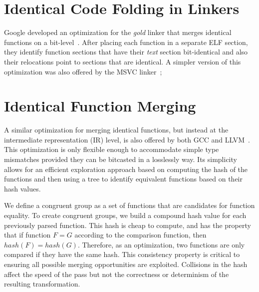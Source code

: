 
\section{Identical Code Folding in Linkers}

Google developed an optimization for the \textit{gold} linker that merges
identical functions on a bit-level~\cite{tallam10,kwan12}.
After placing each function in a separate ELF section, they identify function
sections that have their \textit{text} section bit-identical and also their
relocations point to sections that are identical. A simpler version of this
optimization was also offered by the MSVC linker~\cite{msvc-icf};

\section{Identical Function Merging}

A similar optimization for merging identical functions, but instead at the
intermediate representation (IR) level, is also offered by both GCC and
LLVM~\cite{llvm-fm,livska14}.
This optimization is only flexible enough to accommodate simple type mismatches
provided they can be bitcasted in a losslessly way.
Its simplicity allows for an efficient exploration approach based on computing
the hash of the functions and then using a tree to identify equivalent functions
based on their hash values.



We define a congruent group as a set of functions that are candidates for function
equality.
To create congruent groups, we build a compound hash value for each previously parsed function.
This hash is
cheap to compute, and has the property that if function $F = G$ according to
the comparison function, then $hash(F) = hash(G)$.
Therefore, as an optimization, two functions are only compared if they have the
same hash.
This consistency property
is critical to ensuring all possible merging opportunities are exploited.
Collisions in the hash affect the speed of the pass but not the correctness
or determinism of the resulting transformation.

